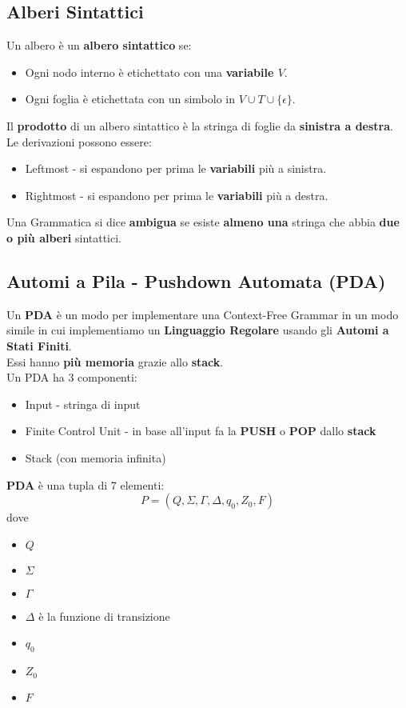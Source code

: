 \documentclass[14pt]{extarticle}
\begin{document}
\subsection{Alberi Sintattici}
Un albero è un \textbf{albero sintattico} se:
\begin{itemize}
    \item Ogni nodo interno è etichettato con una \textbf{variabile $V$}.
    \item Ogni foglia è etichettata con un simbolo in $V \cup T \cup \{\epsilon\}$.
\end{itemize}
Il \textbf{prodotto} di un albero sintattico è la stringa di foglie da \textbf{sinistra a destra}.\\
Le derivazioni possono essere:
\begin{itemize}
    \item Leftmost - si espandono per prima le \textbf{variabili} più a sinistra.
    \item Rightmost - si espandono per prima le \textbf{variabili} più a destra.
\end{itemize}
Una Grammatica si dice \textbf{ambigua} se esiste \textbf{almeno una} stringa che abbia \textbf{due o più alberi} sintattici.

\subsection{Automi a Pila - Pushdown Automata (PDA)}
Un \textbf{PDA} è un modo per implementare una Context-Free Grammar in un modo simile in cui implementiamo un \textbf{Linguaggio Regolare} usando gli \textbf{Automi a Stati Finiti}.\\
Essi hanno \textbf{più memoria} grazie allo \textbf{stack}.\\
Un PDA ha 3 componenti:
\begin{itemize}
    \item Input - stringa di input
    \item Finite Control Unit - in base all'input fa la \textbf{PUSH} o \textbf{POP} dallo \textbf{stack}
    \item Stack (con memoria infinita)
\end{itemize}
\textbf{PDA} è una tupla di 7 elementi:
\begin{equation*}
    P=(Q,\Sigma,\Gamma,\Delta,q_0,Z_0,F)
\end{equation*}
dove
\begin{itemize}
    \item $Q$
    \item $\Sigma$
    \item $\Gamma$
    \item $\Delta$ è la funzione di transizione
    \item $q_0$
    \item $Z_0$
    \item $F$
\end{itemize}
\end{document}
